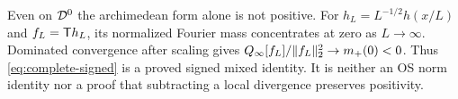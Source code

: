 Even on $\mathcal D^0$ the archimedean form alone is not positive.
For $h_L=L^{-1/2}h(x/L)$ and $f_L=\mathsf T h_L$, its normalized
Fourier mass concentrates at zero as $L\to\infty$.
Dominated convergence after scaling gives
$Q_\infty[f_L]/\lVert f_L\rVert_2^2\to m_+(0)<0$.
Thus \eqref{eq:complete-signed} is a proved signed mixed
identity. It is neither an OS norm identity nor a proof that
subtracting a local divergence preserves positivity.
